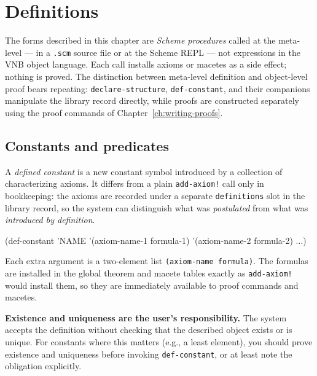 \chapter{Definitions}
\label{ch:defs}

The forms described in this chapter are \emph{Scheme procedures} called
at the meta-level --- in a \texttt{.scm} source file or at the Scheme
REPL --- not expressions in the VNB object language.  Each call installs
axioms or macetes as a side effect; nothing is
proved.  The distinction between meta-level definition and object-level
proof bears repeating: \texttt{declare-structure}, \texttt{def-constant},
and their companions manipulate the library record directly, while
proofs are constructed separately using the proof commands of
Chapter~\ref{ch:writing-proofs}.

\section{Constants and predicates}
\label{sec:def-constant}

A \emph{defined constant} is a new constant symbol introduced by a
collection of characterizing axioms.  It differs from a plain
\texttt{add-axiom!} call only in bookkeeping: the axioms are
recorded under a separate \texttt{definitions} slot in the library record,
so the system can distinguish what was \emph{postulated} from what was
\emph{introduced by definition}.

\begin{VNBcode}
(def-constant 'NAME
  '(axiom-name-1 formula-1)
  '(axiom-name-2 formula-2)
  ...)
\end{VNBcode}

\begin{sloppypar}Each extra argument is a two-element list \texttt{(axiom-name formula)}.
The formulas are installed in the global theorem and macete tables exactly
as \texttt{add-axiom!} would install them, so they are immediately
available to proof commands and macetes.\end{sloppypar}

\textbf{Existence and uniqueness are the user's responsibility.}  The
system accepts the definition without checking that the described object
exists or is unique.  For constants where this matters (e.g., a least
element), you should prove existence and uniqueness before invoking
\texttt{def-constant}, or at least note the obligation explicitly.

